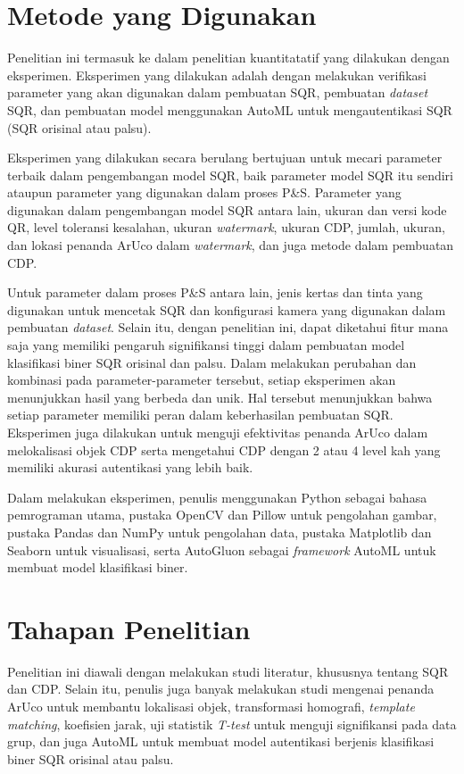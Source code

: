 \section{Metode yang Digunakan}
Penelitian ini termasuk ke dalam penelitian kuantitatatif yang dilakukan dengan eksperimen. Eksperimen yang dilakukan adalah dengan melakukan verifikasi
parameter yang akan digunakan dalam pembuatan SQR, pembuatan \emph{dataset} SQR, dan pembuatan model menggunakan AutoML untuk mengautentikasi SQR (SQR orisinal
atau palsu).

Eksperimen yang dilakukan secara berulang bertujuan untuk mecari parameter terbaik dalam pengembangan model SQR, baik parameter model SQR itu sendiri ataupun
parameter yang digunakan dalam proses P\&S. Parameter yang digunakan dalam pengembangan model SQR antara lain, ukuran dan versi kode QR, level toleransi
kesalahan, ukuran \emph{watermark}, ukuran CDP, jumlah, ukuran, dan lokasi penanda ArUco dalam \emph{watermark}, dan juga metode dalam pembuatan CDP.

Untuk parameter dalam proses P\&S antara lain, jenis kertas dan tinta yang digunakan untuk mencetak SQR dan konfigurasi kamera yang digunakan dalam pembuatan
\emph{dataset}. Selain itu, dengan penelitian ini, dapat diketahui fitur mana saja yang memiliki pengaruh signifikansi tinggi dalam pembuatan model klasifikasi
biner SQR orisinal dan palsu. Dalam melakukan perubahan dan kombinasi pada parameter-parameter tersebut, setiap eksperimen akan menunjukkan hasil yang berbeda
dan unik. Hal tersebut menunjukkan bahwa setiap parameter memiliki peran dalam keberhasilan pembuatan SQR. Eksperimen juga dilakukan untuk menguji efektivitas
penanda ArUco dalam melokalisasi objek CDP serta mengetahui CDP dengan 2 atau 4 level kah yang memiliki akurasi autentikasi yang lebih baik.

Dalam melakukan eksperimen, penulis menggunakan Python sebagai bahasa pemrograman utama, pustaka OpenCV dan Pillow untuk pengolahan gambar, pustaka Pandas dan
NumPy untuk pengolahan data, pustaka Matplotlib dan Seaborn untuk visualisasi, serta AutoGluon sebagai \emph{framework} AutoML untuk membuat model klasifikasi
biner.

\section{Tahapan Penelitian}
Penelitian ini diawali dengan melakukan studi literatur, khususnya tentang SQR dan CDP. Selain itu, penulis juga banyak melakukan studi mengenai penanda ArUco
untuk membantu lokalisasi objek, transformasi homografi, \emph{template matching}, koefisien jarak, uji statistik \emph{T-test} untuk menguji signifikansi pada
data grup, dan juga AutoML untuk membuat model autentikasi berjenis klasifikasi biner SQR orisinal atau palsu.

